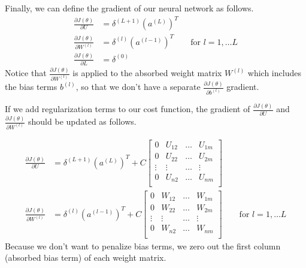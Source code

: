 \documentclass[letterpaper]{article}
\begin{document}
Finally, we can define the gradient of our neural network as follows.
\begin{equation}
\begin{split}
\frac{\partial J(\theta)}{\partial U} &
= \delta^{(L+1)} (a^{(L)})^T \\
\frac{\partial J(\theta)}{\partial W^{(l)}} &
= \delta^{(l)}(a^{(l-1)})^T \qquad \textrm{for } l = 1, \dots L \\
\frac{\partial J(\theta)}{\partial L} &
= \delta^{(0)}
\end{split}
\end{equation}
Notice that $\frac{\partial J(\theta)}{\partial W^{(l)}}$ is applied to the absorbed weight matrix $W^{(l)}$ which includes the bias terms $b^{(l)}$, so that we don't have a separate $\frac{\partial J(\theta)}{\partial b^{(l)}}$ gradient.

\vspace{0.1cm}

If we add regularization terms to our cost function, the gradient of $\frac{\partial J(\theta)}{\partial U}$ and  $\frac{\partial J(\theta)}{\partial W^{(l)}}$ should be updated as follows.

\begin{equation*}
\begin{split}
\frac{\partial J(\theta)}{\partial U} &
= \delta^{(L+1)} (a^{(L)})^T + C 
\begin{bmatrix}
0 & U_{12} & \dots & U_{1m} \\
0 & U_{22} & \dots & U_{2m} \\
\vdots & \vdots & \dots & \vdots  \\
0 & U_{n2} & \dots & U_{nm} \\
\end{bmatrix} \\
\frac{\partial J(\theta)}{\partial W^{(l)}} &
= \delta^{(l)}(a^{(l-1)})^T + C
\begin{bmatrix}
0 & W_{12} & \dots & W_{1m} \\
0 & W_{22} & \dots & W_{2m} \\
\vdots & \vdots & \dots & \vdots  \\
0 & W_{n2} & \dots & W_{nm} \\
\end{bmatrix}
\qquad \textrm{for } l = 1, \dots L
\end{split}
\end{equation*}
Because we don't want to penalize bias terms, we zero out the first column (absorbed bias term) of each weight matrix.
\end{document}
